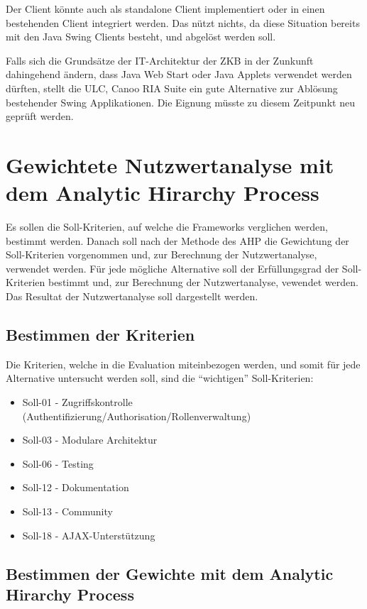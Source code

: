   Der Client könnte auch als standalone Client implementiert oder in einen
  bestehenden Client integriert werden. Das nützt nichts, da diese Situation
  bereits mit den Java Swing Clients besteht, und abgelöst werden soll.
  
  Falls sich die Grundsätze der IT-Architektur der \ac{ZKB} in der Zunkunft
  dahingehend ändern, dass Java Web Start oder Java Applets verwendet werden
  dürften, stellt die ULC, Canoo RIA Suite ein gute Alternative zur Ablösung
  bestehender Swing Applikationen. Die Eignung müsste zu diesem Zeitpunkt neu
  geprüft werden.
    
  \section{Gewichtete Nutzwertanalyse mit dem Analytic Hirarchy Process}
  
  Es sollen die Soll-Kriterien, auf welche die Frameworks verglichen werden,
  bestimmt werden. Danach soll nach der Methode des \ac{AHP} die Gewichtung der
  Soll-Kriterien vorgenommen und, zur Berechnung der Nutzwertanalyse,
  verwendet werden. Für jede mögliche Alternative soll der Erfüllungsgrad der
  Soll-Kriterien bestimmt und, zur Berechnung der Nutzwertanalyse, vewendet
  werden. Das Resultat der Nutzwertanalyse soll dargestellt werden.
  
  \subsection{Bestimmen der Kriterien}
  
  Die Kriterien, welche in die Evaluation miteinbezogen werden, und somit für
  jede Alternative untersucht werden soll, sind die ``wichtigen''
  Soll-Kriterien:
  
  \begin{itemize}
    \item Soll-01 - Zugriffskontrolle 
    (Authentifizierung/Authorisation/Rollenverwaltung)
    \item Soll-03 - Modulare Architektur
    \item Soll-06 - Testing
    \item Soll-12 - Dokumentation
    \item Soll-13 - Community
    \item Soll-18 - AJAX-Unterstützung
  \end{itemize}
  
  \subsection{Bestimmen der Gewichte mit dem Analytic Hirarchy Process}
  
